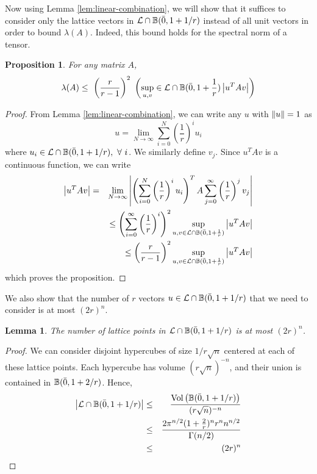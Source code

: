 \documentclass{book}
\newtheorem{lemma}[theorem]{Lemma}
\newtheorem{proposition}[theorem]{Proposition}
\numberwithin{exercise}{chapter}
\begin{document}
Now using Lemma \ref{lem:linear-combination}, we will show that it
suffices to consider only the lattice vectors in ${\cal L} \cap
\mathbb{B}(\bar{0}, 1 + 1/r)$ instead of all unit vectors in order to bound $\lambda(A)$.
Indeed, this bound holds for the spectral norm of a tensor.

\begin{proposition} \label{prop:reduce}
For any matrix $A$,
\[
\lambda(A) \leq~ \left(\frac{r}{r-1}\right)^2~ \left( \sup_{u,v} \in
{\cal L} \cap \mathbb{B}(\bar{0}, 1 + \frac{1}{r}) \left| u^TAv \right| \right)
\]
\end{proposition}

\begin{proof}
From Lemma \ref{lem:linear-combination}, we can write any
$u$ with ${\| u \|} = 1$ as
\[
u = \lim_{N \rightarrow \infty} \sum_{i=0}^{N} \left(
\frac{1}{r} \right)^{i} u_{i}
\]
where $u_{i} \in {\cal L} \cap \mathbb{B}(\bar{0}, 1 + 1/r),~ \forall~
i$. We similarly define $v_{j}$.
Since $u^TAv$ is a continuous function, we can write
\begin{eqnarray*}
\left| u^TAv \right| &=& \lim_{N \rightarrow
\infty} \left| \left( \sum_{i=0}^{N} \left( \frac{1}{r}
\right)^{i} u_{i}\right)^TA\sum_{j=0}^\infty \left( \frac{1}{r}
\right)^{j} v_{j} \right| \\
&& \leq \left( \sum_{i=0}^{\infty} \left( \frac{1}{r} \right)^{i}
\right)^{2} \sup_{u,v \in {\cal L} \cap
\mathbb{B}(\bar{0}, 1 + \frac{1}{r})} \left| u^TAv \right| \\
&& \leq \left(\frac{r}{r-1} \right)^{2} \sup_{u,v \in {\cal L} \cap \mathbb{B}(\bar{0}, 1 + \frac{1}{r})} \left| u^TAv \right|
\end{eqnarray*}
which proves the proposition.
\end{proof}

We also show that the number of $r$ vectors $u \in {\cal L} \cap \mathbb{B}(\bar{0}, 1 + 1/r)$ that we need
to consider is at most $(2r)^{n}$.

\begin{lemma} \label{lem:size-of-set}
The number of lattice points in ${\cal L} \cap \mathbb{B}(\bar{0}, 1 + 1/r)$
is at most $(2r)^{n}$.
\end{lemma}

\begin{proof}
We can consider disjoint hypercubes of size $1/r \sqrt{n}$
centered at each of these lattice points. Each hypercube has
volume $(r \sqrt{n})^{-n}$, and their union is contained in
$\mathbb{B}(\bar{0}, 1 + 2/r)$. Hence,
\begin{eqnarray*}
\left| {\cal L} \cap \mathbb{B}(\bar{0}, 1 + 1/r) \right| &\leq&
\frac{\text{Vol} \left( \mathbb{B}(\bar{0}, 1 + 1/r) \right)}{(r
\sqrt{n})^{-n}} \\
& \leq &\frac{2 \pi^{n/2} (1 + \frac{2}{r})^{n} r^{n}
n^{n/2}}{\Gamma(n/2)} \\
& \leq &(2r)^{n}
\end{eqnarray*}
\end{proof}
\end{document}
